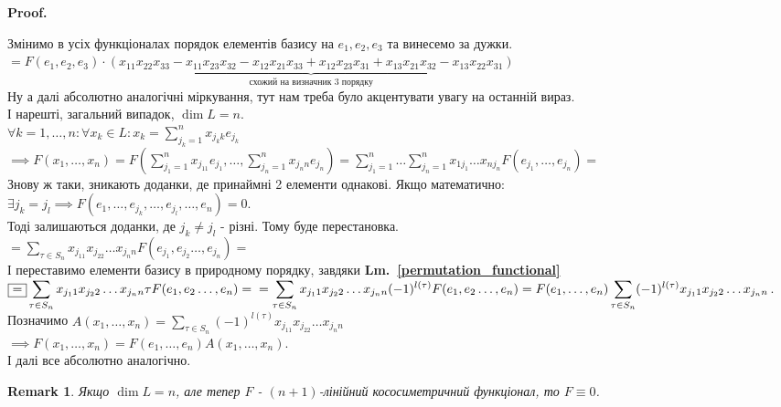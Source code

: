 \documentclass[a4paper, 10pt]{article}
\makeatletter
\theoremstyle{theoremdd}
\newtheorem{remark}[theorem]{Remark}
\newcommand\lmref[1]{\textbf{Lm.~\ref{#1}}}
\renewenvironment{proof}[1][Proof.\\]{\par
\pushQED{\hfill \qed}%
\normalfont \topsep6\p@\@plus6\p@\relax
\trivlist
\item\relax
{\bfseries
#1\@addpunct{.}}\hspace\labelsep\ignorespaces
}{%
\popQED\endtrivlist\@endpefalse
}
\makeatother
\begin{document}
\begin{proof}
Змінимо в усіх функціоналах порядок елементів базису на $e_1,e_2,e_3$ та винесемо за дужки.\\
$\boxed{=} F(e_1,e_2,e_3)\cdot \underbrace{(x_{11}x_{22}x_{33} - x_{11}x_{23}x_{32} - x_{12}x_{21}x_{33} + x_{12}x_{23}x_{31} + x_{13}x_{21}x_{32} - x_{13}x_{22}x_{31})}_{\textrm{схожий на визначник 3 порядку}}$\\
Ну а далі абсолютно аналогічні міркування, тут нам треба було акцентувати увагу на останній вираз.
\bigskip \\
І нарешті, загальний випадок, $\dim L = n$.\\
$\forall k = 1,\dots,n: \forall x_k \in L: x_k = \displaystyle \sum_{j_k=1}^{n} x_{j_kk}e_{j_k}$\\
$\implies F(x_1,\dots,x_n) = \displaystyle F\left(\sum_{j_1=1}^{n} x_{j_11}e_{j_1}, \dots, \sum_{j_n=1}^{n} x_{j_n n}e_{j_n}\right) = \sum_{j_1 = 1}^n \dots \sum_{j_n = 1}^n x_{1j_1}\dots x_{nj_n} F(e_{j_1},\dots,e_{j_n}) \boxed{=}$\\
Знову ж таки, зникають доданки, де принаймні 2 елементи однакові. Якщо математично:\\
$\exists j_k = j_l \implies F(e_1,\dots, e_{j_k}, \dots, e_{j_l}, \dots, e_n) = 0$.\\
Тоді залишаються доданки, де $j_k \neq j_l$ - різні. Тому буде перестановка.\\
$\displaystyle \boxed{=} \sum_{\tau \in S_n} x_{j_11}x_{j_22}\dots x_{j_nn} F(e_{j_1},e_{j_2}\dots, e_{j_n}) \boxed{=}$\\
І переставимо елементи базису в природному порядку, завдяки \lmref{permutation_functional} \\
$\displaystyle \boxed{=} \sum_{\tau \in S_n} x_{j_11}x_{j_22}\dots x_{j_nn} \tau F(e_1,e_2\dots, e_n) = \\
= \displaystyle \sum_{\tau \in S_n} x_{j_11}x_{j_22}\dots x_{j_nn} (-1)^{l(\tau)} F(e_1,e_2\dots, e_n) = \displaystyle F(e_1,\dots,e_n) \sum_{\tau \in S_n} (-1)^{l(\tau)} x_{j_11}x_{j_22}\dots x_{j_nn}$.\\
Позначимо $A(x_1,\dots,x_n) = \displaystyle \sum_{\tau \in S_n} (-1)^{l(\tau)} x_{j_11}x_{j_22}\dots x_{j_nn}$\\
$\implies F(x_1,\dots,x_n) = F(e_1,\dots,e_n)A(x_1,\dots,x_n)$.\\
І далі все абсолютно аналогічно.
\end{proof}

\begin{remark}
Якщо $\dim L = n$, але тепер $F$ - $(n+1)$-лінійний кососиметричний функціонал, то $F \equiv 0$.
\end{remark}
\end{document}
